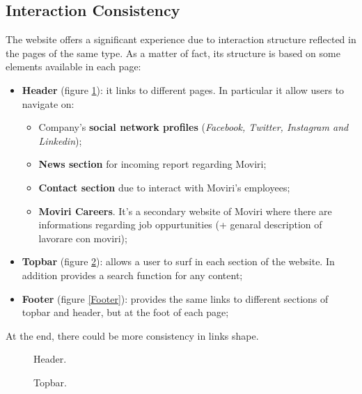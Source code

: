 \subsection{Interaction Consistency}
The website offers a significant experience due to interaction structure reflected in the pages of the same type. As a matter of fact, its structure is based on some elements available in each page: 
\begin{itemize}
\item \textbf{Header} (figure \ref{Header}): it links to different pages. In particular it allow users to navigate on:
\begin{itemize}
\item Company's \textbf{social network profiles} (\textit{Facebook, Twitter, Instagram and Linkedin});
\item \textbf{News section} for incoming report regarding Moviri;
\item \textbf{Contact section} due to interact with Moviri's employees;
\item \textbf{Moviri Careers}. It's a secondary website of Moviri where there are informations regarding job oppurtunities (+ genaral description of lavorare con moviri);
\end{itemize}
\item \textbf{Topbar} (figure \ref{topbar}): allows a user to surf in each section of the website. In addition provides a search function for any content; 
\item \textbf{Footer} (figure \ref{Footer}): provides the same links to different sections of topbar and header, but at the foot of each page;
\end{itemize}
At the end, there could be more consistency in links shape.	


\begin{figure}[H]
  \centering
  \caption{Header.}
   \label{Header}
\end{figure}

\begin{figure}[H]
  \centering
  \caption{Topbar.}
   \label{topbar}
\end{figure}

